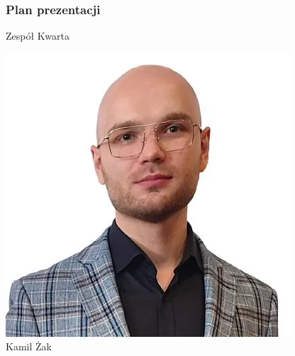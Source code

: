 

{
\begin{frame}
\titlepage
\end{frame}
}







\begin{frame}
\frametitle{Plan prezentacji}
\tableofcontents[pausesections]
\end{frame}


\begin{frame}[t]{Zespół Kwarta}
\centering
\begin{minipage}{0.22\linewidth}
\centering
\includegraphics[width=\linewidth]{img/KZ}\\
\scriptsize Kamil Żak \\
\scriptsize {}
\end{minipage}\pause
\hspace{2em}
\begin{minipage}{0.22\linewidth}
\centering

\end{minipage}
\end{frame}
